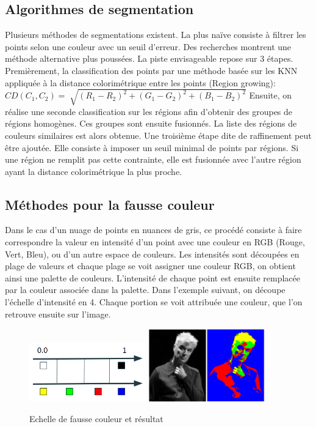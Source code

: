 \documentclass[12pt,titlepage,french]{article}
\begin{document}
\subsection{Algorithmes de segmentation}
Plusieurs méthodes de segmentations existent. La plus naïve consiste à filtrer les points selon une couleur avec un seuil d'erreur.
Des recherches montrent une méthode alternative plus poussées.
La piste envisageable repose sur 3 étapes.
Premièrement, la classification des points par une méthode basée sur les KNN appliquée à la distance colorimétrique entre les points (Region growing):
$
CD(C_1,C_2)=\sqrt[]{(R_1-R_2)^2 + (G_1-G_2)^2 + (B_1-B_2)^2}
$
Ensuite, on réalise une seconde classification sur les régions afin d'obtenir des groupes de régions homogènes.
Ces groupes sont ensuite fusionnés. La liste des régions de couleurs similaires est alors obtenue.
Une troisième étape dite de raffinement peut être ajoutée. Elle consiste à imposer un seuil minimal de points par régions.
Si une région ne remplit pas cette contrainte, elle est fusionnée avec l'autre région ayant la distance colorimétrique la plus proche.

\subsection{Méthodes pour la fausse couleur}
Dans le cas d'un nuage de points en nuances de gris, ce procédé consiste à faire correspondre la valeur en intensité d'un point avec une couleur en RGB (Rouge, Vert, Bleu), ou d'un autre espace de couleurs.
Les intensités sont découpées en plage de valeurs et chaque plage se voit assigner une couleur RGB, on obtient ainsi une palette de couleurs. L'intensité de chaque point est ensuite remplacée par la couleur associée dans la palette.
Dans l'exemple suivant, on découpe l'échelle d'intensité en 4. Chaque portion se voit attribuée une couleur, que l'on retrouve ensuite sur l'image.

\begin{figure}[!hbtp]
  \caption{\label{} Echelle de fausse couleur et résultat}
  \includegraphics[width=0.45\textwidth]{./false_color_scale.png}
  \includegraphics[width=0.45\textwidth]{./false_color.png}
\end{figure}
\end{document}
